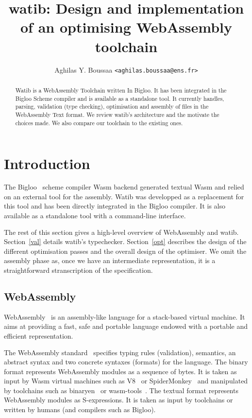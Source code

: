 \documentclass[10pt]{article}
\author{Aghilas Y. Boussaa \texttt{<aghilas.boussaa@ens.fr>}}
\title{\textsf{watib}: Design and implementation of an optimising WebAssembly
  toolchain}
\begin{document}
\maketitle
\begin{abstract}
  Watib is a WebAssembly Toolchain written In Bigloo. It has been integrated in
  the Bigloo Scheme compiler and is available as a standalone tool. It currently
  handles, parsing, validation (type checking), optimisation and assembly of
  files in the WebAssembly Text format. We review watib's architecture and the
  motivate the choices made. We also compare our toolchain to the existing ones.
\end{abstract}

\section{Introduction}
The Bigloo~\cite{Bigloo} scheme compiler Wasm backend generated textual Wasm and
relied on an external tool for the assembly. Watib was developped as a
replacement for this tool and has been directly integrated in the Bigloo
compiler. It is also available as a standalone tool with a command-line
interface.

The rest of this section gives a high-level overview of WebAssembly and watib.
Section~\ref{val} details watib's typechecker. Section~\ref{opt} describes the
design of the different optimisation passes and the overall design of the
optimiser. We omit the assembly phase as, once we have an intermediate
representation, it is a straightforward stranscription of the specification.
\subsection{WebAssembly}
WebAssembly~\cite{haas2017bringing} is an assembly-like language for a
stack-based virtual machine. It aims at providing a fast, safe and portable
language endowed with a portable and efficient representation.

The WebAssembly standard~\cite{WebAssemblyCoreSpecification3} specifies typing
rules (validation), semantics, an abstract syntax and two concrete syntaxes
(formats) for the language. The binary format represents WebAssembly modules as
a sequence of bytes. It is taken as input by Wasm virtual machines such as
V8~\cite{V8} or SpiderMonkey~\cite{SpiderMonkey} and manipulated by toolchains
such as binaryen~\cite{Binaryen} or wasm-tools~\cite{WasmTools}. The textual
format represents WebAssembly modules as S-expressions. It is taken as input by
toolchains or written by humans (and compilers such as Bigloo).
\end{document}

